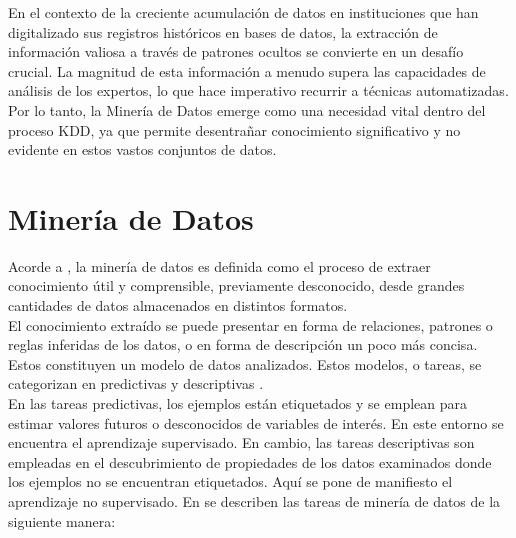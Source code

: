 En el contexto de la creciente acumulación de datos en instituciones que han digitalizado sus registros históricos en bases de datos, la extracción de información valiosa a través de patrones ocultos se convierte en un desafío crucial. La magnitud de esta información a menudo supera las capacidades de análisis de los expertos, lo que hace imperativo recurrir a técnicas automatizadas. Por lo tanto, la Minería de Datos emerge como una necesidad vital dentro del proceso KDD, ya que permite desentrañar conocimiento significativo y no evidente en estos vastos conjuntos de datos.

\section{Minería de Datos}
Acorde a \citep{orallo2004}, la minería de datos es definida como el proceso de extraer conocimiento útil y comprensible, previamente desconocido, desde grandes cantidades de datos almacenados en distintos formatos. \\
El conocimiento extraído se puede presentar en forma de relaciones, patrones o reglas inferidas de los datos, o en forma de descripción un poco más concisa. Estos constituyen un modelo de datos analizados. Estos modelos, o tareas, se categorizan en predictivas y descriptivas \citep{orallo2004}. \\
En las tareas predictivas, los ejemplos están etiquetados y se emplean para estimar valores futuros o desconocidos de variables de interés. En este entorno se encuentra el aprendizaje supervisado. En cambio, las tareas descriptivas son empleadas en el descubrimiento de propiedades de los datos examinados donde los ejemplos no se encuentran etiquetados. Aquí se pone de manifiesto el aprendizaje no supervisado. En \citep{orallo2004} se describen las tareas de minería de datos de la siguiente manera:
